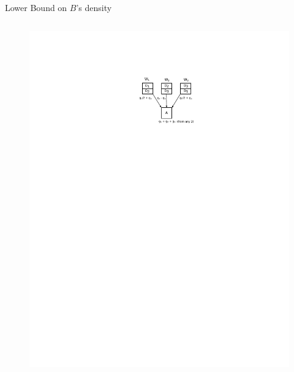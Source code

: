 \documentclass{beamer}
\begin{document}
\begin{frame}{Lower Bound on $B$’s density}
\begin{columns}
\begin{column}{.5\linewidth}
\begin{figure}
    \centering
    \includegraphics[width=\textwidth]{res/gradient coding.pdf}
\end{figure}

\end{column}

\end{columns}

\end{frame}
\end{document}
